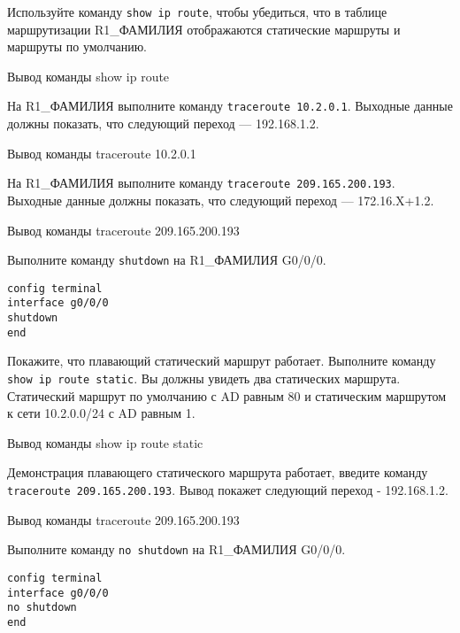 Используйте команду \texttt{show ip route}, чтобы убедиться,
что в таблице маршрутизации R1\_ФАМИЛИЯ отображаются статические маршруты
и маршруты по умолчанию.

\begin{image}
    \caption{Вывод команды show ip route}
\end{image}

На R1\_ФАМИЛИЯ выполните команду \texttt{traceroute 10.2.0.1}.
Выходные данные должны показать, что следующий переход — 192.168.1.2.

\begin{image}
    \caption{Вывод команды traceroute 10.2.0.1}
\end{image}

На R1\_ФАМИЛИЯ выполните команду \texttt{traceroute 209.165.200.193}.
Выходные данные должны показать, что следующий переход — 172.16.X+1.2.

\begin{image}
    \caption{Вывод команды traceroute 209.165.200.193}
\end{image}

Выполните команду \texttt{shutdown} на R1\_ФАМИЛИЯ G0/0/0.

\begin{verbatim}
config terminal
interface g0/0/0
shutdown
end
\end{verbatim}

Покажите, что плавающий статический маршрут работает.
Выполните команду \texttt{show ip route static}.
Вы должны увидеть два статических маршрута.
Статический маршрут по умолчанию с AD
равным 80 и статическим маршрутом к сети 10.2.0.0/24 с AD равным 1.

\begin{image}
    \caption{Вывод команды show ip route static}
\end{image}

Демонстрация плавающего статического маршрута работает,
введите команду \texttt{traceroute 209.165.200.193}.
Вывод покажет следующий переход - 192.168.1.2.

\begin{image}
    \caption{Вывод команды traceroute 209.165.200.193}
\end{image}

Выполните команду \texttt{no shutdown} на R1\_ФАМИЛИЯ G0/0/0.

\begin{verbatim}
config terminal
interface g0/0/0
no shutdown
end
\end{verbatim}

